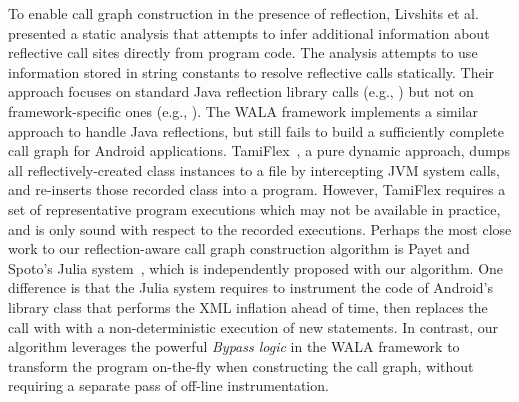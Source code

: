 To enable call graph construction in the presence of  reflection,
Livshits et al.~\cite{Livshits:2005} presented a static analysis
that attempts to infer additional information about
reflective call sites directly from program code. The analysis
attempts to use information stored in string constants to resolve
reflective calls statically. Their approach focuses on standard Java
reflection library calls (e.g., ) but not on
framework-specific ones (e.g., ).
The WALA framework implements a similar approach to handle Java
reflections, but still fails to build a sufficiently complete call graph for
Android applications. TamiFlex~\cite{Bodden:2011}, a pure dynamic
approach, dumps all reflectively-created class instances to a file
by intercepting JVM system calls, and re-inserts those recorded 
class into a program. However, TamiFlex requires a set of representative
program executions which may not be available in practice,
 and is only sound with respect to the recorded executions.
Perhaps the most close work to our reflection-aware call graph
construction algorithm is Payet and Spoto's Julia
system~\cite{Payet:2011:SAA:2032266.2032299}, which is independently
proposed with our algorithm. One difference is that the Julia system
requires to instrument the code of Android's library class
 that performs the XML inflation ahead of time,
then replaces the  call with with a
non-deterministic execution of new statements.
In contrast, our algorithm leverages the powerful \textit{Bypass logic}
in the WALA framework to transform the program on-the-fly when
constructing the call graph, without requiring a separate pass of
off-line instrumentation.







 
